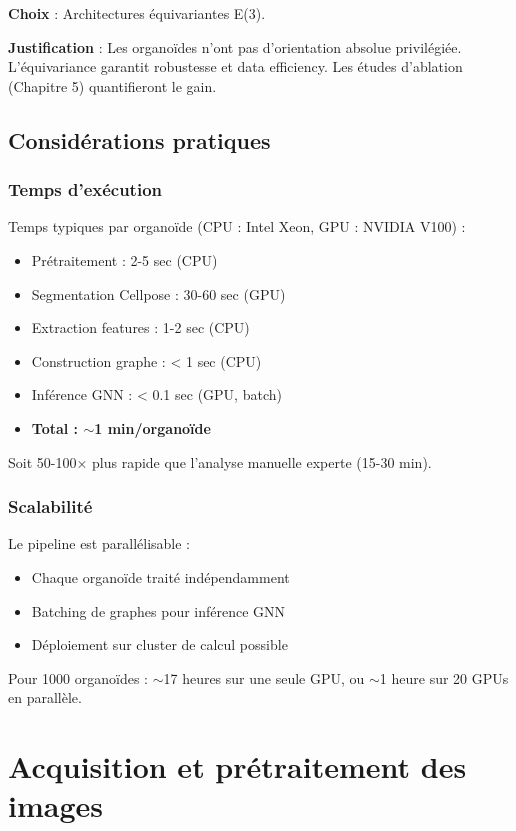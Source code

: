 \textbf{Choix} : Architectures équivariantes E(3).

\textbf{Justification} : Les organoïdes n'ont pas d'orientation absolue privilégiée. L'équivariance garantit robustesse et data efficiency. Les études d'ablation (Chapitre 5) quantifieront le gain.

\subsection{Considérations pratiques}

\subsubsection{Temps d'exécution}

Temps typiques par organoïde (CPU : Intel Xeon, GPU : NVIDIA V100) :
\begin{itemize}
    \item Prétraitement : 2-5 sec (CPU)
    \item Segmentation Cellpose : 30-60 sec (GPU)
    \item Extraction features : 1-2 sec (CPU)
    \item Construction graphe : < 1 sec (CPU)
    \item Inférence GNN : < 0.1 sec (GPU, batch)
    \item \textbf{Total : $\sim$1 min/organoïde}
\end{itemize}

Soit 50-100× plus rapide que l'analyse manuelle experte (15-30 min).

\subsubsection{Scalabilité}

Le pipeline est parallélisable :
\begin{itemize}
    \item Chaque organoïde traité indépendamment
    \item Batching de graphes pour inférence GNN
    \item Déploiement sur cluster de calcul possible
\end{itemize}

Pour 1000 organoïdes : $\sim$17 heures sur une seule GPU, ou $\sim$1 heure sur 20 GPUs en parallèle.

\section{Acquisition et prétraitement des images}

